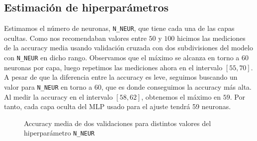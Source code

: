 \documentclass[a4]{article}
\begin{document}
\subsection{Estimación de hiperparámetros}

Estimamos el número de neuronas, \texttt{N\_NEUR}, que tiene cada una
de las capas ocultas. Como nos recomendaban valores entre $50$ y $100$
hicimos las mediciones de la accuracy media usando validación cruzada
con dos subdivisiones del modelo con \texttt{N\_NEUR} en dicho
rango. Observamos que el máximo se alcanza en torno a $60$ neuronas
por capa, luego repetimos las mediciones ahora en el intervalo
$[55,70]$. A pesar de que la diferencia entre la accuracy es leve,
seguimos buscando un valor para \texttt{N\_NEUR} en torno a $60$, que
es donde conseguimos la accuracy más alta. Al medir la accuracy en el
intervalo $[58,62]$, obtenemos el máximo en $59$. Por tanto, cada capa
oculta del MLP usado para el ajuste tendrá 59 neuronas.

\begin{figure}[H]
  \centering
  \caption{Accuracy media de dos validaciones para distintos valores del hiperparámetro \texttt{N\_NEUR}}
  \label{fig:HyperparametersRF}
\end{figure}
\end{document}
